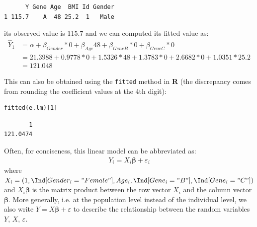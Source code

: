 \documentclass[12pt]{article}
\newcommand\Rlogo{\textbf{\textsf{R}}\xspace} %
\begin{document}
\begin{verbatim}
      Y Gene Age  BMI Id Gender
1 115.7    A  48 25.2  1   Male
\end{verbatim}
its observed value is 115.7 and we can computed its fitted value as:
\begin{align*}
\hat{Y}_1 &= \alpha + \beta_{Gender} * 0 + \beta_{Age} 48 + \beta_{GeneB} * 0 + \beta_{GeneC} * 0 \\
          &= 21.3988 + 0.9778 * 0 + 1.5326 * 48 + 1.3783 * 0 + 2.6682 * 0 + 1.0351 * 25.2 \\
          & = 121.048
\end{align*}

\clearpage 

This can also be obtained using the \texttt{fitted} method in \Rlogo{} (the
discrepancy comes from rounding the coefficient values at the 4th
digit):
\lstset{language=r,label= ,caption= ,captionpos=b,numbers=none}
\begin{lstlisting}
fitted(e.lm)[1]
\end{lstlisting}

\begin{verbatim}
       1 
121.0474
\end{verbatim}

Often, for conciseness, this linear model can be abbreviated as:
\begin{align*}
Y_i = X_i \boldsymbol{\beta} + \varepsilon_i
\end{align*}
where \(X_i = \left(1, \Ind[Gender_i="Female"], Age_i,
\Ind[Gene_i="B"], \Ind[Gene_i="C"]\right)\) and \(X_i
\boldsymbol{\beta}\) is the matrix product between the row vector
\(X_i\) and the column vector \(\boldsymbol{\beta}\). More generally,
i.e. at the population level instead of the individual level, we also
write \(Y = X \boldsymbol{\beta} + \varepsilon\) to describe the
relationship between the random variables \(Y\), \(X\),
\(\varepsilon\).
\end{document}
